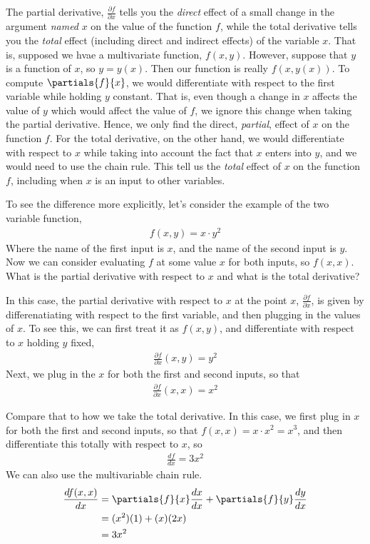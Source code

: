 The partial derivative, $\frac{\partial f}{\partial x}$ tells you the \emph{direct} effect of a small change in the argument \emph{named} $x$ on the value of the function $f$, while the total derivative tells you the \emph{total} effect (including direct and indirect effects) of the variable $x$. That is, supposed we hvae a multivariate function, $f(x, y)$. However, suppose that $y$ is a function of $x$, so $y = y(x)$. Then our function is really $f(x, y(x))$. To compute $\partials{f}{x}$, we would differentiate with respect to the first variable while holding $y$ constant. That is, even though a change in $x$ affects the value of $y$ which would affect the value of $f$, we ignore this change when taking the partial derivative. Hence, we only find the direct, \emph{partial}, effect of $x$ on the function $f$. For the total derivative, on the other hand, we would differentiate with respect to $x$ while taking into account the fact that $x$ enters into $y$, and we would need to use the chain rule. This tell us the \emph{total} effect of $x$ on the function $f$, including when $x$ is an input to other variables.

To see the difference more explicitly, let's consider the example of the two variable function, 
\begin{align*}
    f(x, y) = x \cdot y^2
\end{align*}
Where the name of the first input is $x$, and the name of the second input is $y$. Now we can consider evaluating $f$ at some value $x$ for both inputs, so $f(x, x)$. What is the partial derivative with respect to $x$ and what is the total derivative?

In this case, the partial derivative with respect to $x$ at the point $x$, $\frac{\partial f}{\partial x}$, is given by differenatiating with respect to the first variable, and then plugging in the values of $x$. To see this, we can first treat it as $f(x, y)$, and differentiate with respect to $x$ holding $y$ fixed,
\begin{align*}
    \frac{\partial f}{\partial x}(x, y) = y^2
\end{align*}
Next, we plug in the $x$ for both the first and second inputs, so that
\begin{align*}
    \frac{\partial f}{\partial x}(x, x) = x^2
\end{align*}

Compare that to how we take the total derivative. In this case, we first plug in $x$ for both the first and second inputs, so that $f(x, x) = x \cdot x^2 = x^3$, and then differentiate this totally with respect to $x$, so
\begin{align*}
    \frac{df}{dx} = 3x^2
\end{align*}
We can also use the multivariable chain rule.
\begin{align*}
    \frac{df(x, x)}{dx} &= \partials{f}{x} \frac{dx}{dx} + \partials{f}{y} \frac{dy}{dx} \\
    &= (x^2) (1)+ (x) (2x) \\
    &= 3x^2
\end{align*}

